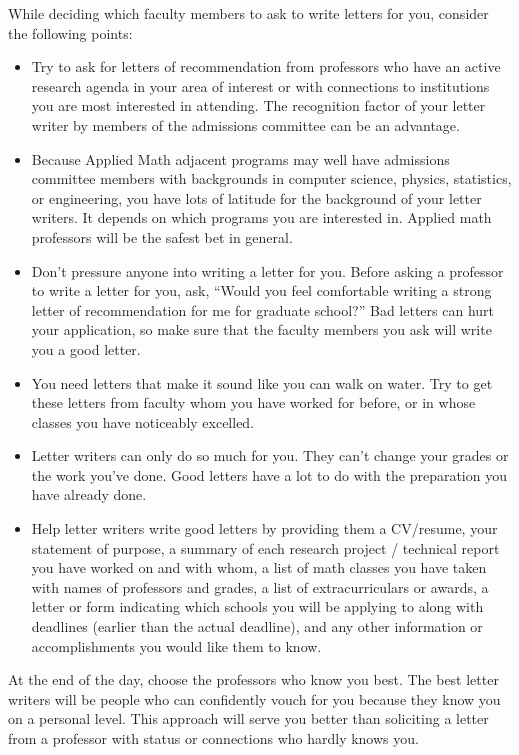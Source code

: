 \documentclass[11pt]{article}
\begin{document}
While deciding which faculty members to ask to write letters for you, consider the following points:
\begin{itemize}
\item Try to ask for letters of recommendation from professors who have an active research agenda in your area of interest or with connections to institutions you are most interested in attending. The recognition factor of your letter writer by members of the admissions committee can be an advantage. 
\item Because Applied Math adjacent programs may well have admissions committee members with backgrounds in computer science, physics, statistics, or engineering, you have lots of latitude for the background of your letter writers. It depends on which programs you are interested in. Applied math professors will be the safest bet in general.
\item Don’t pressure anyone into writing a letter for you. Before asking a professor to write a letter for you, ask, “Would you feel comfortable writing a strong letter of recommendation for me for graduate school?” Bad letters can hurt your application, so make sure that the faculty members you ask will write you a good letter.
\item You need letters that make it sound like you can walk on water. Try to get these letters from faculty whom you have worked for before, or in whose classes you have noticeably excelled.
\item Letter writers can only do so much for you. They can't change your grades or the work you've done. Good letters have a lot to do with the preparation you have already done.
\item Help letter writers write good letters by providing them a CV/resume, your statement of purpose, a summary of each research project / technical report you have worked on and with whom, a list of  math classes you have taken with names of professors and grades, a list of extracurriculars or awards, a letter or form indicating which schools you will be applying to along with deadlines (earlier than the actual deadline), and any other information or accomplishments you would like them to know.
\end{itemize}

At the end of the day, choose the professors who know you best. The best letter writers will be people who can confidently vouch for you because they know you on a personal level. This approach will serve you better than soliciting a letter from a professor with status or connections who hardly knows you.
\end{document}
